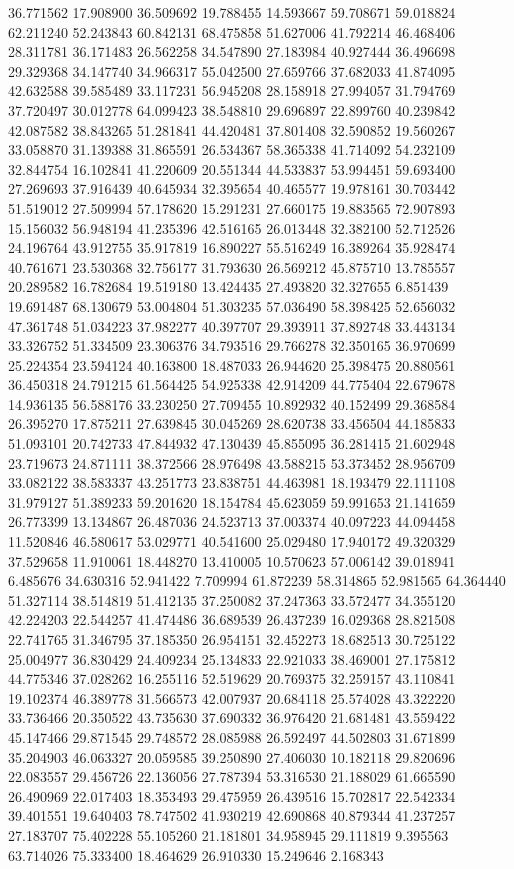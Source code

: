 36.771562
17.908900
36.509692
19.788455
14.593667
59.708671
59.018824
62.211240
52.243843
60.842131
68.475858
51.627006
41.792214
46.468406
28.311781
36.171483
26.562258
34.547890
27.183984
40.927444
36.496698
29.329368
34.147740
34.966317
55.042500
27.659766
37.682033
41.874095
42.632588
39.585489
33.117231
56.945208
28.158918
27.994057
31.794769
37.720497
30.012778
64.099423
38.548810
29.696897
22.899760
40.239842
42.087582
38.843265
51.281841
44.420481
37.801408
32.590852
19.560267
33.058870
31.139388
31.865591
26.534367
58.365338
41.714092
54.232109
32.844754
16.102841
41.220609
20.551344
44.533837
53.994451
59.693400
27.269693
37.916439
40.645934
32.395654
40.465577
19.978161
30.703442
51.519012
27.509994
57.178620
15.291231
27.660175
19.883565
72.907893
15.156032
56.948194
41.235396
42.516165
26.013448
32.382100
52.712526
24.196764
43.912755
35.917819
16.890227
55.516249
16.389264
35.928474
40.761671
23.530368
32.756177
31.793630
26.569212
45.875710
13.785557
20.289582
16.782684
19.519180
13.424435
27.493820
32.327655
6.851439
19.691487
68.130679
53.004804
51.303235
57.036490
58.398425
52.656032
47.361748
51.034223
37.982277
40.397707
29.393911
37.892748
33.443134
33.326752
51.334509
23.306376
34.793516
29.766278
32.350165
36.970699
25.224354
23.594124
40.163800
18.487033
26.944620
25.398475
20.880561
36.450318
24.791215
61.564425
54.925338
42.914209
44.775404
22.679678
14.936135
56.588176
33.230250
27.709455
10.892932
40.152499
29.368584
26.395270
17.875211
27.639845
30.045269
28.620738
33.456504
44.185833
51.093101
20.742733
47.844932
47.130439
45.855095
36.281415
21.602948
23.719673
24.871111
38.372566
28.976498
43.588215
53.373452
28.956709
33.082122
38.583337
43.251773
23.838751
44.463981
18.193479
22.111108
31.979127
51.389233
59.201620
18.154784
45.623059
59.991653
21.141659
26.773399
13.134867
26.487036
24.523713
37.003374
40.097223
44.094458
11.520846
46.580617
53.029771
40.541600
25.029480
17.940172
49.320329
37.529658
11.910061
18.448270
13.410005
10.570623
57.006142
39.018941
6.485676
34.630316
52.941422
7.709994
61.872239
58.314865
52.981565
64.364440
51.327114
38.514819
51.412135
37.250082
37.247363
33.572477
34.355120
42.224203
22.544257
41.474486
36.689539
26.437239
16.029368
28.821508
22.741765
31.346795
37.185350
26.954151
32.452273
18.682513
30.725122
25.004977
36.830429
24.409234
25.134833
22.921033
38.469001
27.175812
44.775346
37.028262
16.255116
52.519629
20.769375
32.259157
43.110841
19.102374
46.389778
31.566573
42.007937
20.684118
25.574028
43.322220
33.736466
20.350522
43.735630
37.690332
36.976420
21.681481
43.559422
45.147466
29.871545
29.748572
28.085988
26.592497
44.502803
31.671899
35.204903
46.063327
20.059585
39.250890
27.406030
10.182118
29.820696
22.083557
29.456726
22.136056
27.787394
53.316530
21.188029
61.665590
26.490969
22.017403
18.353493
29.475959
26.439516
15.702817
22.542334
39.401551
19.640403
78.747502
41.930219
42.690868
40.879344
41.237257
27.183707
75.402228
55.105260
21.181801
34.958945
29.111819
9.395563
63.714026
75.333400
18.464629
26.910330
15.249646
2.168343
